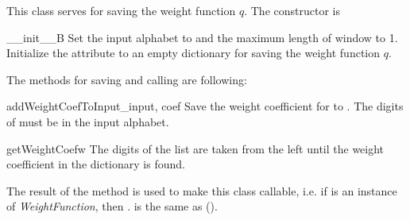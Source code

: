 This class serves for saving the weight function $q$. The constructor is

\begin{method}{\_\_init\_\_}{B}
Set the input alphabet to  and the maximum length of window to 1. Initialize the attribute  to an empty dictionary for saving the weight function $q$. 
\end{method}

The methods for saving and calling are following:

\begin{method}{addWeightCoefToInput}{\_input, coef}
Save the weight coefficient  for  to . The digits of  must be in the input alphabet.
\end{method}

\begin{method}{getWeightCoef}{w}
The digits of the list  are taken from the left until the weight coefficient in the dictionary  is found. 
\end{method}

The result of the method  is used to make this class callable, i.e. if  is an instance of \emph{WeightFunction}, then . is the same as ().




